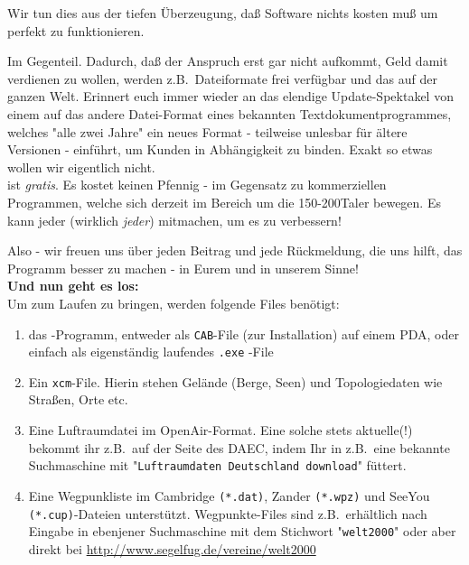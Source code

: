 Wir tun dies aus der tiefen Überzeugung, daß Software nichts kosten muß um perfekt zu funktionieren.

Im Gegenteil. Dadurch, daß der Anspruch erst gar nicht aufkommt, Geld damit verdienen zu wollen, werden z.B.\ Dateiformate frei verfügbar und das auf der ganzen Welt.  Erinnert euch immer wieder an das elendige Update-Spektakel von einem auf das andere Datei-Format eines bekannten Textdokumentprogrammes, welches "alle zwei Jahre" ein neues Format - teilweise unlesbar für ältere Versionen - einführt, um Kunden in Abhängigkeit zu binden. Exakt so etwas wollen wir eigentlich nicht.\\

\xc ist  \textit{gratis}. Es kostet keinen Pfennig - im Gegensatz zu kommerziellen Programmen, welche sich derzeit im Bereich um die 150-200Taler bewegen. Es kann jeder (wirklich \textsl{jeder}) mitmachen, um es zu verbessern!

Also - wir freuen uns über jeden Beitrag und jede Rückmeldung, die uns hilft, das Programm besser zu machen - in Eurem und in unserem Sinne!\\[1em]


\large{\textbf{Und nun geht es los: }}\\[1em]

Um \xc  zum Laufen zu bringen, werden folgende Files benötigt:
\begin{enumerate}\i
\item das \xc -Programm, entweder als \texttt{CAB}-File (zur Installation) auf einem PDA, oder einfach als eigenständig laufendes \texttt{.exe} -File
\item Ein \texttt{xcm}-File. Hierin stehen Gelände (Berge, Seen) und Topologiedaten wie Straßen, Orte etc.\
\item Eine Luftraumdatei im \textsf{OpenAir}-Format. Eine solche stets aktuelle(!) bekommt ihr z.B.\ auf der Seite des \textsc{DAEC}, indem Ihr in z.B.\ eine bekannte Suchmaschine mit "\texttt{Luftraumdaten Deutschland download}" füttert.
\item Eine Wegpunkliste im Cambridge  \texttt{(*.dat)}, Zander  \texttt{(*.wpz)} und SeeYou \texttt{(*.cup)}-Dateien unterstützt.
Wegpunkte-Files sind z.B.\ erhältlich nach Eingabe in ebenjener Suchmaschine mit dem Stichwort "\texttt{welt2000}" oder aber direkt bei \url{http://www.segelfug.de/vereine/welt2000}
\end{enumerate}

